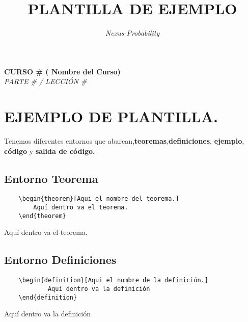 \documentclass[a4paper,12pt]{article}
\title{\textcolor{green1}{\textbf{PLANTILLA DE EJEMPLO}}}
\author{\textit{Nexus-Probability}}
\date{}
\begin{document}
\maketitle
\begin{center}
\textbf{CURSO \# ( Nombre del Curso)} \\ 
\vspace{0.5em}
\textit{PARTE \# / LECCIÓN \#} 
\end{center}

\section{EJEMPLO DE PLANTILLA.}

Tenemos diferentes entornos que abarcan,\textbf{teoremas},\textbf{definiciones}, \textbf{ejemplo}, \textbf{código} y \textbf{salida de código.}

    \subsection*{Entorno Teorema}
    \begin{verbatim}
    \begin{theorem}[Aqui el nombre del teorema.]
        Aquí dentro va el teorema.
    \end{theorem}
    \end{verbatim}
        \begin{theorem}
            Aquí dentro va el teorema.
        \end{theorem}

    \subsection*{Entorno Definiciones}
    \begin{verbatim}
    \begin{definition}[Aqui el nombre de la definición.]
            Aquí dentro va la definición
    \end{definition}
    \end{verbatim}
        \begin{definition}
            Aquí dentro va la definición
        \end{definition}
\end{document}
